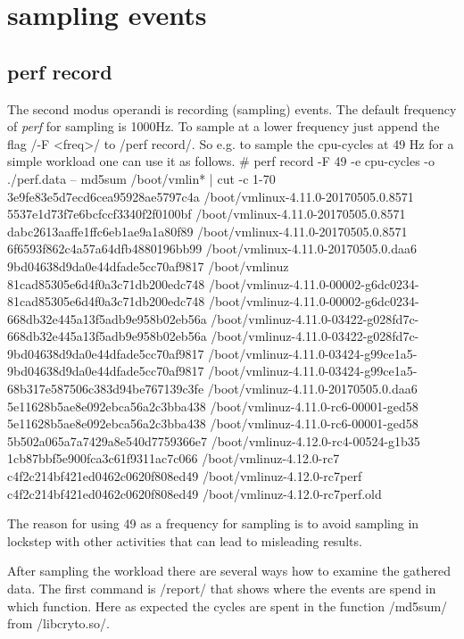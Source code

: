 \chapter{sampling events}
\section{perf record}
The second modus operandi is recording (sampling) events. The default frequency of {\em perf}
for sampling is 1000Hz. To sample at a lower frequency just append the flag /-F <freq>/ to
/perf record/. So e.g. to sample the cpu-cycles at 49 Hz for a simple workload one can use
it as follows.
\starttyping
# perf record -F 49  -e cpu-cycles -o ./perf.data -- md5sum /boot/vmlin* | cut -c 1-70
3e9fe83e5d7ecd6cea95928ae5797c4a  /boot/vmlinux-4.11.0-20170505.0.8571
5537e1d73f7e6bcfccf3340f2f0100bf  /boot/vmlinux-4.11.0-20170505.0.8571
dabc2613aaffe1ffc6eb1ae9a1a80f89  /boot/vmlinux-4.11.0-20170505.0.8571
6f6593f862c4a57a64dfb4880196bb99  /boot/vmlinux-4.11.0-20170505.0.daa6
9bd04638d9da0e44dfade5cc70af9817  /boot/vmlinuz
81cad85305e6d4f0a3c71db200edc748  /boot/vmlinuz-4.11.0-00002-g6dc0234-
81cad85305e6d4f0a3c71db200edc748  /boot/vmlinuz-4.11.0-00002-g6dc0234-
668db32e445a13f5adb9e958b02eb56a  /boot/vmlinuz-4.11.0-03422-g028fd7c-
668db32e445a13f5adb9e958b02eb56a  /boot/vmlinuz-4.11.0-03422-g028fd7c-
9bd04638d9da0e44dfade5cc70af9817  /boot/vmlinuz-4.11.0-03424-g99ce1a5-
9bd04638d9da0e44dfade5cc70af9817  /boot/vmlinuz-4.11.0-03424-g99ce1a5-
68b317e587506c383d94be767139c3fe  /boot/vmlinuz-4.11.0-20170505.0.daa6
5e11628b5ae8e092ebca56a2c3bba438  /boot/vmlinuz-4.11.0-rc6-00001-ged58
5e11628b5ae8e092ebca56a2c3bba438  /boot/vmlinuz-4.11.0-rc6-00001-ged58
5b502a065a7a7429a8e540d7759366e7  /boot/vmlinuz-4.12.0-rc4-00524-g1b35
1cb87bbf5e900fca3c61f9311ac7c066  /boot/vmlinuz-4.12.0-rc7
c4f2c214bf421ed0462c0620f808ed49  /boot/vmlinuz-4.12.0-rc7perf
c4f2c214bf421ed0462c0620f808ed49  /boot/vmlinuz-4.12.0-rc7perf.old
\stoptyping

The reason for using 49 as a frequency for sampling is to avoid
sampling in lockstep with other activities that can lead to misleading
results.

After sampling the workload there are several ways how to examine the
gathered data.  The first command is /report/ that shows where the
events are spend in which function. Here as expected the cycles are
spent in the function /md5sum/ from /libcryto.so/.

